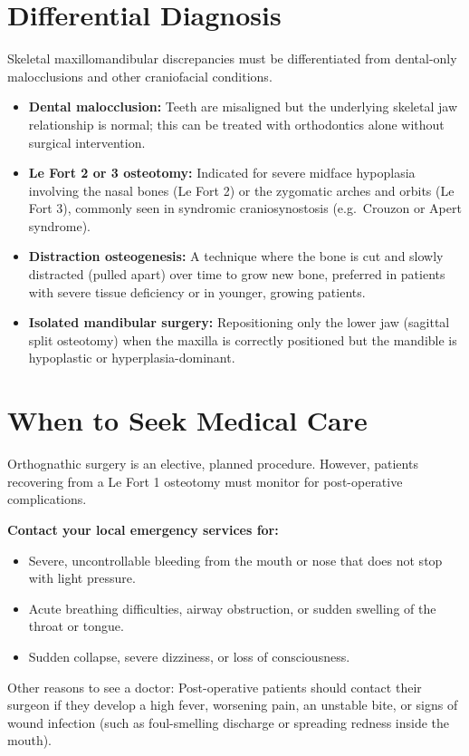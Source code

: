 \section*{Differential Diagnosis}
Skeletal maxillomandibular discrepancies must be differentiated from dental-only malocclusions and other craniofacial conditions.
\begin{itemize}
    \item \textbf{Dental malocclusion:} Teeth are misaligned but the underlying skeletal jaw relationship is normal; this can be treated with orthodontics alone without surgical intervention.
    \item \textbf{Le Fort 2 or 3 osteotomy:} Indicated for severe midface hypoplasia involving the nasal bones (Le Fort 2) or the zygomatic arches and orbits (Le Fort 3), commonly seen in syndromic craniosynostosis (e.g.\ Crouzon or Apert syndrome).
    \item \textbf{Distraction osteogenesis:} A technique where the bone is cut and slowly distracted (pulled apart) over time to grow new bone, preferred in patients with severe tissue deficiency or in younger, growing patients.
    \item \textbf{Isolated mandibular surgery:} Repositioning only the lower jaw (sagittal split osteotomy) when the maxilla is correctly positioned but the mandible is hypoplastic or hyperplasia-dominant.
\end{itemize}

\section*{When to Seek Medical Care}
Orthognathic surgery is an elective, planned procedure. However, patients recovering from a Le Fort 1 osteotomy must monitor for post-operative complications.

\textbf{Contact your local emergency services for:}
\begin{itemize}
    \item Severe, uncontrollable bleeding from the mouth or nose that does not stop with light pressure.
    \item Acute breathing difficulties, airway obstruction, or sudden swelling of the throat or tongue.
    \item Sudden collapse, severe dizziness, or loss of consciousness.
\end{itemize}
Other reasons to see a doctor: Post-operative patients should contact their surgeon if they develop a high fever, worsening pain, an unstable bite, or signs of wound infection (such as foul-smelling discharge or spreading redness inside the mouth).

